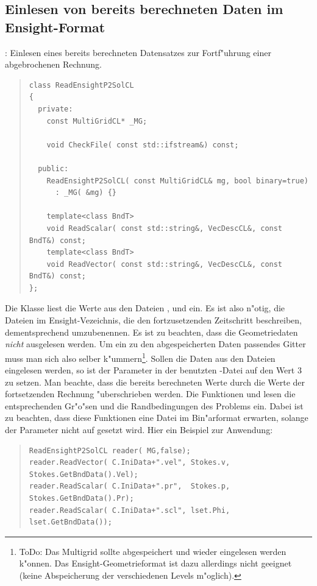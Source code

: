 \documentclass[11pt,a4paper]{article}
\newenvironment{Code}{\begin{quote}\scriptsize}{\end{quote}}
\begin{document}
\subsection{Einlesen von bereits berechneten Daten im Ensight-Format}
: Einlesen eines bereits berechneten Datensatzes zur 
Fortf"uhrung einer abgebrochenen Rechnung.
\begin{Code}
\begin{verbatim}
class ReadEnsightP2SolCL
{
  private:
    const MultiGridCL* _MG;

    void CheckFile( const std::ifstream&) const;
    
  public:
    ReadEnsightP2SolCL( const MultiGridCL& mg, bool binary=true)
      : _MG( &mg) {}

    template<class BndT>
    void ReadScalar( const std::string&, VecDescCL&, const BndT&) const;
    template<class BndT>
    void ReadVector( const std::string&, VecDescCL&, const BndT&) const;
};

\end{verbatim}
\end{Code}
Die Klasse  liest die Werte aus den 
Dateien ,  und  ein. Es ist also n"otig, die 
Dateien im Ensight-Vezeichnis, die den fortzusetzenden Zeitschritt beschreiben, 
dementsprechend umzubenennen. Es ist zu beachten, dass die Geometriedaten \emph{nicht}
ausgelesen werden. Um ein zu den abgespeicherten Daten passendes Gitter muss man sich also
selber k"ummern\footnote{ToDo: Das Multigrid sollte abgespeichert und wieder eingelesen werden
k"onnen. Das Ensight-Geometrieformat ist dazu allerdings nicht geeignet (keine Abspeicherung
der verschiedenen Levels m"oglich).}.
Sollen die Daten aus den Dateien eingelesen werden, so ist der Parameter  
in der benutzten -Datei auf den Wert $3$ zu setzen. Man beachte, dass die bereits 
berechneten Werte durch die Werte der fortsetzenden Rechnung "uberschrieben werden.
Die Funktionen  und  lesen die entsprechenden Gr"o"sen und 
die Randbedingungen des Problems ein. Dabei ist zu beachten, dass diese Funktionen eine Datei im Bin"arformat erwarten, solange 
der Parameter  nicht auf  gesetzt wird. Hier ein Beispiel zur Anwendung:
\begin{Code}
\begin{verbatim}
ReadEnsightP2SolCL reader( MG,false);
reader.ReadVector( C.IniData+".vel", Stokes.v, Stokes.GetBndData().Vel);
reader.ReadScalar( C.IniData+".pr",  Stokes.p, Stokes.GetBndData().Pr);
reader.ReadScalar( C.IniData+".scl", lset.Phi, lset.GetBndData());
\end{verbatim}
\end{Code}
\end{document}
